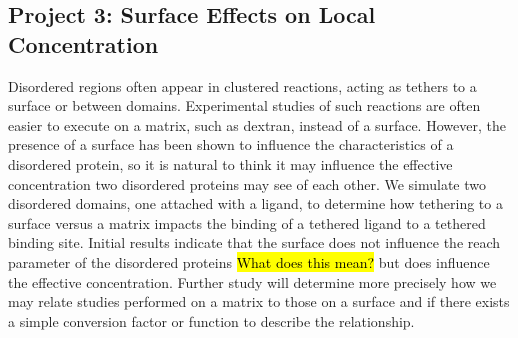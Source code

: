 \documentclass[onecolumn]{article}
\begin{document}
\subsection*{Project 3: Surface Effects on Local Concentration}

Disordered regions often appear in clustered reactions, acting as tethers to a surface or between domains. Experimental studies of such reactions are often easier to execute on a matrix, such as dextran, instead of a surface. However, the presence of a surface has been shown to influence the characteristics of a disordered protein, so it is natural to think it may influence the effective concentration two disordered proteins may see of each other. We simulate two disordered domains, one attached with a ligand, to determine how tethering to a surface versus a matrix impacts the binding of a tethered ligand to a tethered binding site. Initial results indicate that the surface does not influence the reach parameter of the disordered proteins \hl{What does this mean?} but does influence the effective concentration. Further study will determine more precisely how we may relate studies performed on a matrix to those on a surface and if there exists a simple conversion factor or function to describe the relationship.






\end{document}
